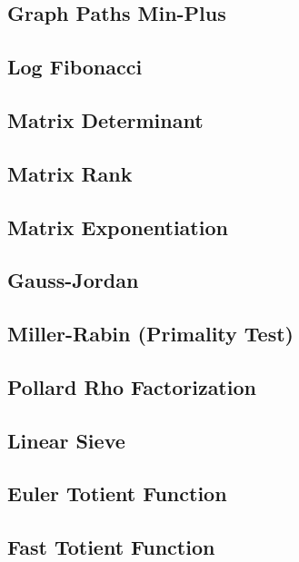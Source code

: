 \documentclass[10pt,letterpaper,landscape,twocolumn]{article}
\begin{document}
\subsection{Graph Paths Min-Plus}

\subsection{Log Fibonacci}

\subsection{Matrix Determinant}

\subsection{Matrix Rank}

\subsection{Matrix Exponentiation}

\subsection{Gauss-Jordan}

\subsection{Miller-Rabin (Primality Test)}

\subsection{Pollard Rho Factorization}

\subsection{Linear Sieve}

\subsection{Euler Totient Function}

\subsection{Fast Totient Function}

\end{document}
